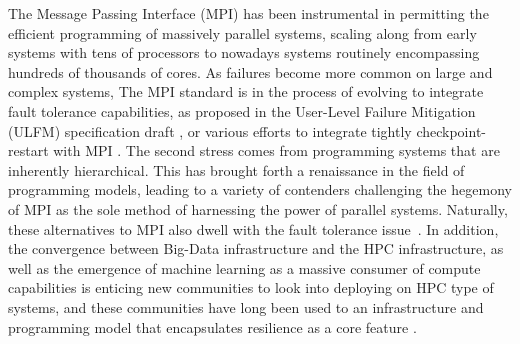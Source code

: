 \documentclass[sigconf]{acmart}
\begin{document}
The Message Passing Interface (MPI) has been instrumental in 
permitting the efficient programming of massively parallel systems, scaling 
along from early systems with tens of processors to nowadays systems routinely 
encompassing hundreds of thousands of cores. As failures become more 
common on large and complex systems, The MPI standard is in the process of 
evolving to integrate fault tolerance capabilities, as proposed in the 
User-Level Failure Mitigation (ULFM) specification draft \cite{Bland2013}, or 
various efforts to integrate tightly checkpoint-restart with MPI \cite{reinit18}.
The second stress comes from programming systems that are inherently
hierarchical. This has brought forth a renaissance in the field of
programming models, leading to a variety of contenders challenging the
hegemony of MPI as the sole method of harnessing the power of parallel systems.
Naturally, these alternatives to MPI also dwell with the fault tolerance
issue~\cite{7161563, doi:10.1177/1094342016669416, shmem-ft15, 10.1007/978-3-319-50995-2_5, X10-ft16}. In addition, the convergence
between Big-Data infrastructure and the HPC infrastructure, as well as
the emergence of machine learning as a massive consumer of compute
capabilities is enticing new communities to look into deploying on HPC
type of systems, and these communities have long been used to an infrastructure
and programming model that encapsulates resilience as a core feature \cite{hadoop-ft}.
\end{document}
